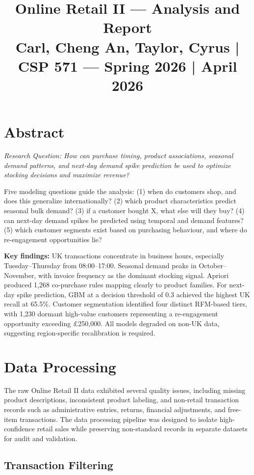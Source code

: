 \documentclass[10pt,a4paper]{article}
\title{\vspace{-2em}\textbf{Online Retail II --- Analysis and Report}\\[1em]
\small Carl, Cheng An, Taylor, Cyrus \quad | \quad CSP 571 --- Spring 2026 \quad | \quad April 2026}
\date{}
\begin{document}
\maketitle
\vspace{0em}

\section{Abstract}

\textit{Research Question: How can purchase timing, product associations, seasonal demand patterns, and next-day demand spike prediction be used to optimize stocking decisions and maximize revenue?}

Five modeling questions guide the analysis: (1) when do customers shop, and does this generalize internationally? (2) which product characteristics predict seasonal bulk demand? (3) if a customer bought X, what else will they buy? (4) can next-day demand spikes be predicted using temporal and demand features? (5) which customer segments exist based on purchasing behaviour, and where do re-engagement opportunities lie?

\textbf{Key findings:} UK transactions concentrate in business hours, especially Tuesday--Thursday from 08:00--17:00. Seasonal demand peaks in October--November, with invoice frequency as the dominant stocking signal. Apriori produced 1,268 co-purchase rules mapping clearly to product families. For next-day spike prediction, GBM at a decision threshold of 0.3 achieved the highest UK recall at 65.5\%. Customer segmentation identified four distinct RFM-based tiers, with 1,230 dormant high-value customers representing a re-engagement opportunity exceeding \pounds250,000. All models degraded on non-UK data, suggesting region-specific recalibration is required.

\section{Data Processing}

The raw Online Retail II data exhibited several quality issues, including missing product descriptions, inconsistent product labeling, and non-retail transaction records such as administrative entries, returns, financial adjustments, and free-item transactions. The data processing pipeline was designed to isolate high-confidence retail sales while preserving non-standard records in separate datasets for audit and validation.

\subsection{Transaction Filtering}
\end{document}
